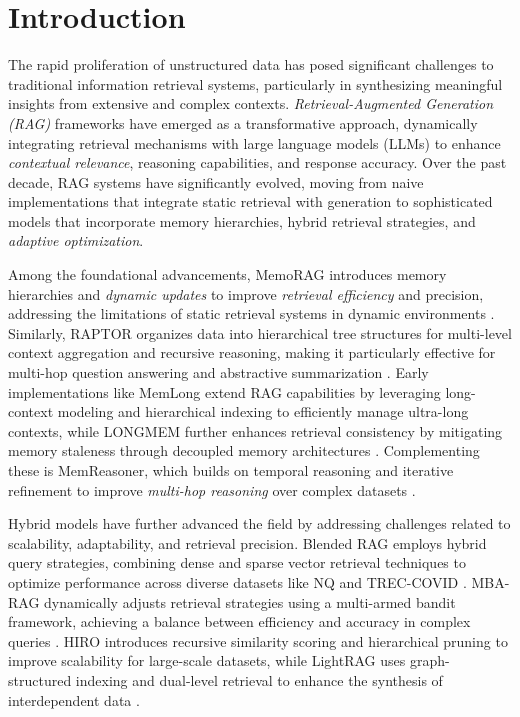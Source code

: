 \documentclass[pdflatex,sn-mathphys-num]{sn-jnl}%
\begin{document}
\maketitle

\section{Introduction}\label{sec1}
The rapid proliferation of unstructured data has posed significant challenges to traditional information retrieval systems, particularly in synthesizing meaningful insights from extensive and complex contexts. \emph{Retrieval-Augmented Generation (RAG)} frameworks have emerged as a transformative approach, dynamically integrating retrieval mechanisms with large language models (LLMs) to enhance \emph{contextual relevance}, reasoning capabilities, and response accuracy. Over the past decade, RAG systems have significantly evolved, moving from naive implementations that integrate static retrieval with generation to sophisticated models that incorporate memory hierarchies, hybrid retrieval strategies, and \emph{adaptive optimization}.

Among the foundational advancements, MemoRAG introduces memory hierarchies and \emph{dynamic updates} to improve \emph{retrieval efficiency} and precision, addressing the limitations of static retrieval systems in dynamic environments \cite{bib1}. Similarly, RAPTOR organizes data into hierarchical tree structures for multi-level context aggregation and recursive reasoning, making it particularly effective for multi-hop question answering and abstractive summarization \cite{bib2}. Early implementations like MemLong extend RAG capabilities by leveraging long-context modeling and hierarchical indexing to efficiently manage ultra-long contexts, while LONGMEM further enhances retrieval consistency by mitigating memory staleness through decoupled memory architectures \cite{bib3, bib4}. Complementing these is MemReasoner, which builds on temporal reasoning and iterative refinement to improve \emph{multi-hop reasoning} over complex datasets \cite{bib5}.

Hybrid models have further advanced the field by addressing challenges related to scalability, adaptability, and retrieval precision. Blended RAG employs hybrid query strategies, combining dense and sparse vector retrieval techniques to optimize performance across diverse datasets like NQ and TREC-COVID \cite{bib6}. MBA-RAG dynamically adjusts retrieval strategies using a multi-armed bandit framework, achieving a balance between efficiency and accuracy in complex queries \cite{bib7}. HIRO introduces recursive similarity scoring and hierarchical pruning to improve scalability for large-scale datasets, while LightRAG uses graph-structured indexing and dual-level retrieval to enhance the synthesis of interdependent data \cite{bib8, bib9}.
\end{document}
